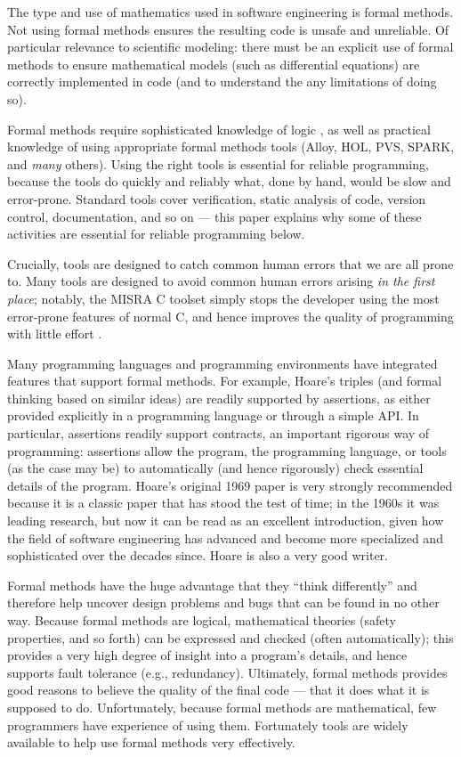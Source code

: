 \documentclass[10pt,a4paper]{article}
\begin{document}
{The type and use of mathematics used in software engineering is formal methods. Not using formal methods ensures the resulting code is unsafe and unreliable. Of particular relevance to scientific modeling: there must be an explicit use of formal methods to ensure  mathematical models (such as differential equations) are correctly implemented in code (and to understand the any limitations of doing so).}

Formal methods require sophisticated knowledge of logic \cite{cbc}, as well as practical knowledge of using appropriate formal methods tools (Alloy, HOL, PVS, SPARK, and \emph{many\/} others). Using the right tools is essential for reliable programming, because the tools do quickly and reliably what, done by hand, would be slow and error-prone. Standard tools cover verification, static analysis of code, version control, documentation, and so on --- this paper explains why some of these activities are essential for reliable programming below. 

Crucially, tools are designed to catch common human errors that we are all prone to. Many tools are designed to avoid common human errors arising \emph{in the first place\/}; notably, the MISRA C toolset simply stops the developer using the most error-prone features of normal C, and hence improves the quality of programming with little effort \cite{misra}.

Many programming languages and programming environments have integrated features that support formal methods. For example, Hoare's triples \cite{hoare} (and formal thinking based on similar ideas) are readily supported by assertions, as either provided explicitly in a programming language or through a simple API\@. In particular, assertions readily support contracts, an important rigorous way of programming: assertions allow the program, the programming language, or tools (as the case may be) to automatically (and hence rigorously) check essential details of the program. Hoare's original 1969 paper \cite{hoare} is very strongly recommended because it is a classic paper that has stood the test of time; in the 1960s it was leading research, but now it can be read as an excellent introduction, given how the field of software engineering has advanced and become more specialized and sophisticated over the decades since. Hoare is also a very good writer.

Formal methods have the huge advantage that they ``think differently'' and therefore help uncover design problems and bugs that can be found in no other way. Because formal methods are logical, mathematical theories (safety properties, and so forth) can be expressed and checked (often automatically); this provides a very high degree of insight into a program's details, and hence supports fault tolerance (e.g., redundancy). Ultimately, formal methods provides good reasons to believe the quality of the final code --- that it does what it is supposed to do. Unfortunately, because formal methods are mathematical, few programmers have experience of using them. Fortunately tools are widely available to help use formal methods very effectively.
\end{document}
